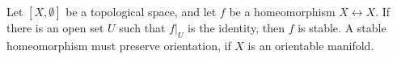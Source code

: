Let $[X, \emptyset]$ be a topological space, and let $f$ be a homeomorphism $X \leftrightarrow X$. If there is an open set $U$ such that $f|_U$ is the identity, then $f$ is stable. A stable homeomorphism must preserve orientation, if $X$ is an orientable manifold.
